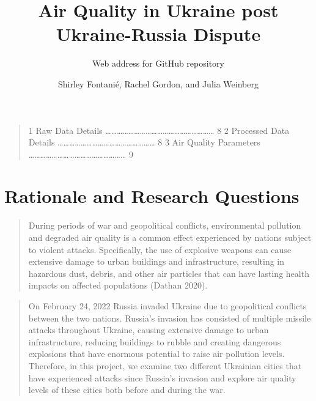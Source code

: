\documentclass[
  12pt,
]{article}
\title{Air Quality in Ukraine post Ukraine-Russia Dispute}
\subtitle{Web address for GitHub repository}
\author{Shirley Fontanié, Rachel Gordon, and Julia Weinberg}
\date{}
\begin{document}
\maketitle

\newpage
\tableofcontents
\newpage
\listoftables

\begin{quote}
1 Raw Data Details
\ldots\ldots\ldots\ldots\ldots\ldots\ldots\ldots\ldots\ldots\ldots\ldots\ldots\ldots\ldots\ldots\ldots\ldots\ldots{}
8 2 Processed Data Details
\ldots\ldots\ldots\ldots\ldots\ldots\ldots\ldots\ldots\ldots\ldots\ldots\ldots\ldots\ldots\ldots\ldots{}
8 3 Air Quality Parameters
\ldots\ldots\ldots\ldots\ldots\ldots\ldots\ldots\ldots\ldots\ldots\ldots\ldots\ldots\ldots\ldots\ldots{}
9
\end{quote}

\newpage 
\listoffigures 
\newpage

\hypertarget{rationale-and-research-questions}{%
\section{Rationale and Research
Questions}\label{rationale-and-research-questions}}

\begin{quote}
During periods of war and geopolitical conflicts, environmental
pollution and degraded air quality is a common effect experienced by
nations subject to violent attacks. Specifically, the use of explosive
weapons can cause extensive damage to urban buildings and
infrastructure, resulting in hazardous dust, debris, and other air
particles that can have lasting health impacts on affected populations
(Dathan 2020).
\end{quote}

\begin{quote}
On February 24, 2022 Russia invaded Ukraine due to geopolitical
conflicts between the two nations. Russia's invasion has consisted of
multiple missile attacks throughout Ukraine, causing extensive damage to
urban infrastructure, reducing buildings to rubble and creating
dangerous explosions that have enormous potential to raise air pollution
levels. Therefore, in this project, we examine two different Ukrainian
cities that have experienced attacks since Russia's invasion and explore
air quality levels of these cities both before and during the war.
\end{quote}
\end{document}
